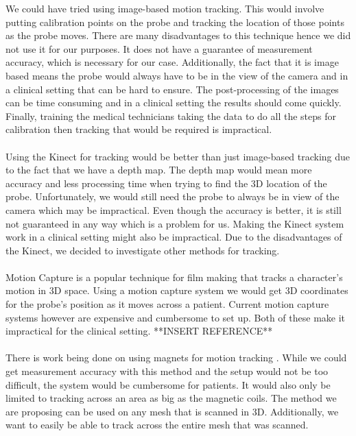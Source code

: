 We could have tried using image-based motion tracking. This would involve putting calibration points on the probe and tracking the location of those points as the probe moves. There are many disadvantages to this technique hence we did not use it for our purposes. It does not have a guarantee of measurement accuracy, which is necessary for our case. Additionally, the fact that it is image based means the probe would always have to be in the view of the camera and in a clinical setting that can be hard to ensure. The post-processing of the images can be time consuming and in a clinical setting the results should come quickly. Finally, training the medical technicians taking the data to do all the steps for calibration then tracking that would be required is impractical. \\
\\
Using the Kinect for tracking would be better than just image-based tracking due to the fact that we have a depth map. The depth map would mean more accuracy and less processing time when trying to find the 3D location of the probe. Unfortunately, we would still need the probe to always be in view of the camera which may be impractical. Even though the accuracy is better, it is still not guaranteed in any way which is a problem for us. Making the Kinect system work in a clinical setting might also be impractical. Due to the disadvantages of the Kinect, we decided to investigate other methods for tracking. \\
\\
Motion Capture is a popular technique for film making that tracks a character's motion in 3D space. Using a motion capture system we would get 3D coordinates for the probe's position as it moves across a patient. Current motion capture systems however are expensive and cumbersome to set up. Both of these make it impractical for the clinical setting. **INSERT REFERENCE**\\
\\
There is work being done on using magnets for motion tracking \cite{magnetictracking}. While we could get measurement accuracy with this method and the setup would not be too difficult, the system would be cumbersome for patients. It would also only be limited to tracking across an area as big as the magnetic coils. The method we are proposing can be used on any mesh that is scanned in 3D. Additionally, we want to easily be able to track across the entire mesh that was scanned.\\
\\

